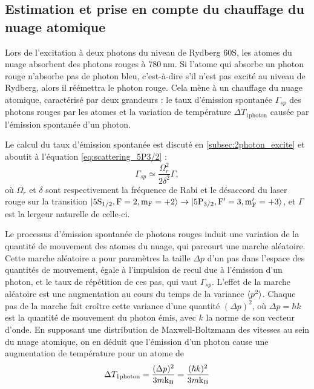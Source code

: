 	\subsection{Estimation et prise en compte du chauffage du nuage atomique}
\noindent Lors de l'excitation à deux photons du niveau de Rydberg $\mathrm{60S}$, les atomes du nuage absorbent des photons rouges à $\SI{780}{\nano\meter}$.
Si l'atome qui absorbe un photon rouge n'absorbe pas de photon bleu, c'est-à-dire s'il n'est pas excité au niveau de Rydberg, alors il réémettra le photon rouge.
Cela mène à un chauffage du nuage atomique, caractérisé par deux grandeurs :
le taux d'émission spontanée $\Gamma_{sp}$ des photons rouges par les atomes et la variation de température $\Delta T_{\text{1photon}}$ causée par l'émission spontanée d'un photon.

Le calcul du taux d'émission spontanée est discuté en \ref{subsec:2photon_excite} et aboutit à l'équation \eqref{eq:scattering_5P3/2} :
\begin{equation}
\label{eq:Gamma_sp}
\Gamma_{sp} \simeq \frac{\Omega_r^2}{2\delta^2}\Gamma,
\end{equation}
où $\Omega_r$ et $\delta$ sont respectivement la fréquence de Rabi et le désaccord du laser rouge sur la transition $\ket{\mathrm{5S_{1/2},F=2,m_F=+2}} \rightarrow \ket{\mathrm{5P_{3/2},F'=3,m_F'=+3}}$, et $\Gamma$ est la lergeur naturelle de celle-ci.

Le processus d'émission spontanée de photons rouges induit une variation de la quantité de mouvement des atomes du nuage, qui parcourt une marche aléatoire.
Cette marche aléatoire a pour paramètres la taille $\Delta p$ d'un pas dans l'espace des quantités de mouvement, égale à l'impulsion de recul due à l'émission d'un photon, et le taux de répétition de ces pas, qui vaut $\Gamma_{sp}$.
L'effet de la marche aléatoire est une augmentation au cours du temps de la variance $\braket{p^2}$.
Chaque pas de la marche fait croître cette variance d'une quantité $(\Delta p)^2$, où $\Delta p = \hbar k$ est la quantité de mouvement du photon émis, avec $k$ la norme de son vecteur d'onde.
En supposant une distribution de Maxwell-Boltzmann des vitesses au sein du nuage atomique, on en déduit que l'émission d'un photon cause une augmentation de température pour un atome de
\begin{equation}
\label{eq:heating_1photon}
\Delta T_{\text{1photon}} = \frac{(\Delta p)^2}{3m\mathrm{k_B}} = \frac{(\hbar k)^2}{3m\mathrm{k_B}}
\end{equation}

